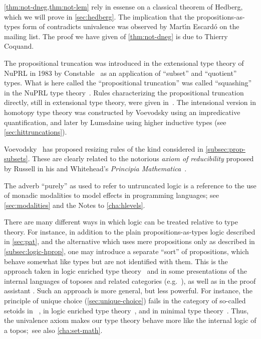 \autoref{thm:not-dneg,thm:not-lem} rely in essense on a classical theorem of Hedberg, which we will prove in \autoref{sec:hedberg}.
The implication that the propositions-as-types form of \LEM{} contradicts univalence was observed by Mart\'\i n Escard\'o on the \Agda mailing list.
The proof we have given of \autoref{thm:not-dneg} is due to Thierry Coquand.

The propositional truncation was introduced in the extensional type theory of
NuPRL in 1983 by Constable~\cite{Con85} as an
application of ``subset'' and ``quotient'' types.  What is here called the
``propositional truncation'' was called ``squashing'' in the NuPRL type theory~\cite{constable+86nuprl-book}.
Rules characterizing the propositional truncation directly, still in extensional type theory, were given in~\cite{ab:bracket-types}.
The intensional version in homotopy type theory was constructed by Voevodsky using an impredicative quantification, and later by Lumsdaine using higher inductive types (see \autoref{sec:hittruncations}).

Voevodsky~\cite{Universe-poly} has proposed resizing rules of the kind considered in \autoref{subsec:prop-subsets}.
These are clearly related to the notorious \emph{axiom of reducibility} proposed by Russell in his and Whitehead's \emph{Principia Mathematica}~\cite{WR:PM}.

The adverb ``purely'' as used to refer to untruncated logic is a reference to the use of monadic modalities to model effects in programming languages; see \autoref{sec:modalities} and the Notes to \autoref{cha:hlevels}.

There are many different ways in which logic can be treated relative to type theory.
For instance, in addition to the plain propositions-as-types logic described in \autoref{sec:pat}, and the alternative which uses mere propositions only as described in \autoref{subsec:logic-hprop}, one may introduce a separate ``sort'' of propositions, which behave somewhat like types but are not identified with them.
This is the approach taken in logic enriched type theory~\cite{aczel2002collection} and in some presentations of the internal languages of toposes and related categories (e.g.~\cite{jacobs1999categorical,elephant}), as well as in the proof assistant \Coq.
Such an approach is more general, but less powerful.
For instance, the principle of unique choice (\autoref{sec:unique-choice}) fails in the category of so-called setoids in \Coq~\cite{Spiwack}, in logic enriched type theory~\cite{aczel2002collection}, and in minimal type theory~\cite{maietti2005toward}.
Thus, the univalence axiom makes our type theory behave more like the internal logic of a topos;~see also \autoref{cha:set-math}.

